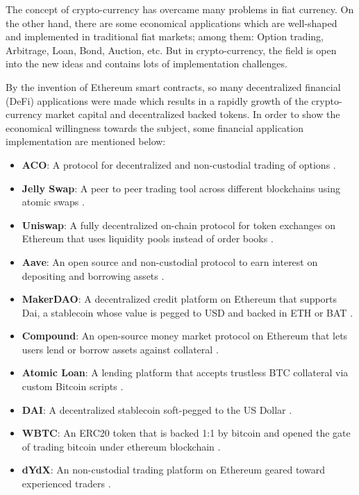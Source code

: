The concept of crypto-currency has overcame many problems in fiat currency. On the other hand, there are some economical applications which are well-shaped and implemented in traditional fiat markets; among them: Option trading, Arbitrage, Loan, Bond, Auction, etc. But in crypto-currency, the field is open into the new ideas and contains lots of implementation challenges. 

By the invention of Ethereum smart contracts, so many decentralized financial (DeFi) applications were made which results in a rapidly growth of the crypto-currency market capital and decentralized backed tokens. In order to show the economical willingness towards the subject, some financial application implementation are mentioned below:





\begin{itemize}
    \item \textbf{ACO}: A protocol for decentralized and non-custodial trading of options \cite{aco}.
    \item \textbf{Jelly Swap}: A peer to peer trading tool across different blockchains using atomic swaps \cite{jelly}.
    \item \textbf{Uniswap}: A fully decentralized on-chain protocol for token exchanges on Ethereum that uses liquidity pools instead of order books \cite{uniswap}.
    \item \textbf{Aave}: An open source and non-custodial protocol to earn interest on depositing and borrowing assets \cite{aave}.
    \item \textbf{MakerDAO}: A decentralized credit platform on Ethereum that supports Dai, a stablecoin whose value is pegged to USD and backed in ETH or BAT \cite{maker}. 
    \item \textbf{Compound}: An open-source money market protocol on Ethereum that lets users lend or borrow assets against collateral \cite{compound}. 
    \item \textbf{Atomic Loan}: A lending platform that accepts trustless BTC collateral via custom Bitcoin scripts \cite{atomicLoan}. 
    \item \textbf{DAI}: A decentralized stablecoin soft-pegged to the US Dollar \cite{maker}. 
    \item \textbf{WBTC}: An ERC20 token that is backed 1:1 by bitcoin and opened the gate of trading bitcoin under ethereum blockchain \cite{wbtc}.
    \item \textbf{dYdX}: An non-custodial trading platform on Ethereum geared toward experienced traders \cite{dydx}. 
    
\end{itemize}

